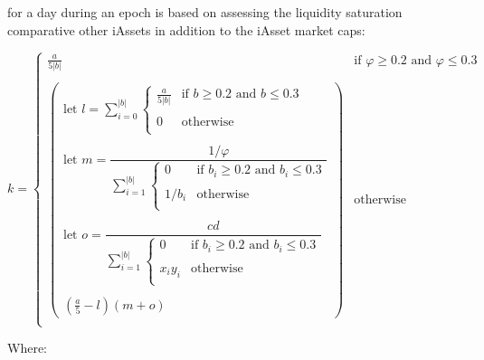 \documentclass{article}
\begin{document}
\begin{sloppypar}
for a day during an epoch is based on assessing the liquidity saturation
comparative other iAssets in addition to the iAsset market caps:

\[k = \left\{ \begin{matrix}
  \frac{a}{5\left|b\right|} & \text{if\ }\varphi \geq 0.2\text{\ and\ }\varphi \leq 0.3 \\ \\
  \begin{pmatrix}
    \text{let\ }l = \sum_{i=0}^{\left| b \right|}\left\{\begin{matrix}
    \frac{a}{5\left|b\right|} & \text{if\ }b\geq 0.2 \text{\ and\ }b \leq 0.3         \\ \\
    0           & \text{otherwise}                                      \\
    \end{matrix}\right. \\ \\
    \text{let\ }m = \dfrac{1 / \varphi}{\sum_{i = 1}^{\left| b \right|}\left\{ \begin{matrix}
    0           & \text{if\ }b_{i} \geq 0.2\text{\ and\ }b_{i} \leq 0.3 \\ \\
    1 / b_{i}   & \text{otherwise}                                      \\
    \end{matrix} \right.}\\ \\
    \text{let\ }o = \dfrac{cd}{\sum_{i = 1}^{\left| b \right|}\left\{ \begin{matrix}
    0           & \text{if\ }b_{i} \geq 0.2\text{\ and\ }b_{i} \leq 0.3 \\ \\
    x_{i}y_{i}  & \text{otherwise}                                      \\
    \end{matrix} \right.} \\ \\
    \left( \frac{a}{5} - l\right) \left( m + o \right)
  \end{pmatrix} & \text{otherwise} \\
  \end{matrix} \right.\]

Where:


\end{sloppypar}
\end{document}
